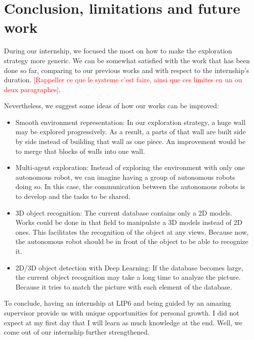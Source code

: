 \documentclass[12pt]{report}
\newcommand{\hc}[1]{\textcolor{red}{[#1]}}
\begin{document}
	
	\chapter*{Conclusion, limitations and future work}
	
	During our internship, we focused the most on how to make the exploration strategy more generic. We can be 
somewhat satisfied with the work that has been done so far, comparing to our previous works and with respect to the 
internship's duration.
\hc{Rappeller ce que le systeme c'est faire, ainsi que ces limites en un ou deux paragraphes}.

	Nevertheless, we suggest some ideas of how our works can be improved:
	\begin{itemize}
		\item Smooth environment representation: In our exploration strategy, a huge wall may be explored 
progressively. As a result, a parts of that wall are built side by side instead of building that wall as one piece. An 
improvement would be to merge that blocks of walls into one wall.
\item Multi-agent exploration: Instead of exploring the 
environment with only one autonomous robot, we can imagine having a group of autonomous robots doing so. In this case, 
the communication between the autonomous robots is to develop and the tasks to be shared.
		\item 3D object recognition: The current database contains only a 2D models. Works could be done in that field to manipulate a 3D models instead of 2D ones. This facilitates the recognition of the object at any views. Because now, the autonomous robot should be in front of the object to be able to recognize it.
		\item 2D/3D object detection with Deep Learning: If the database becomes large, the current object 
recognition may take a long time to analyze the picture. Because it tries to match the picture with each element of the 
database.	
	\end{itemize}

To conclude, having an internship at LIP6 and being guided by an amazing supervisor provide us with unique opportunities for personal growth. I did not expect at my first day that I will learn as much knowledge at the end. Well, we come out of our internship further strengthened. 
	
	


\end{document}
